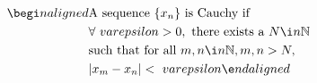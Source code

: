 \documentclass[preview]{standalone}
\begin{document}
\begin{align*}
\begi n {alig n ed}&\text{A  sequence  } \{ x_n \} \text{ is Cauchy if } \\ &\forall \ varepsilon  > 0, \text{ there exists a }  N  \i n   \mathbb{N}  \\ &\text{such that for all }  m ,  n  \i n   \mathbb{N} ,  m ,  n  >  N , \\ &| x_m - x_n | < \ varepsilon \e n d{alig n ed}
\end{align*}
\end{document}
